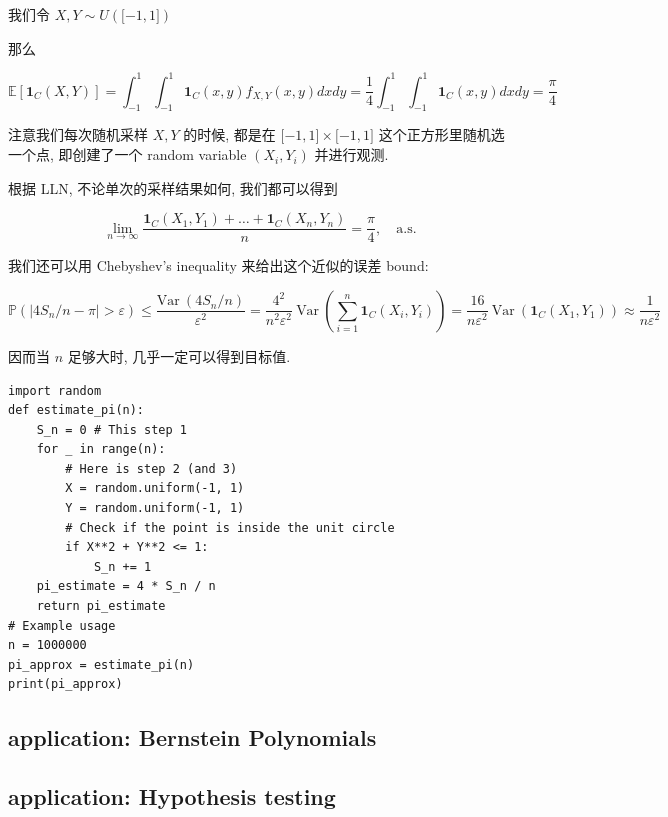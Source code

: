 \documentclass{qlnotes-export}
\begin{document}
\begin{example}[估算 \(\pi\)]

我们令 \(X,Y \sim U(\lbrack - 1,1\rbrack)\)

那么

\[{\mathbb{E}}\left\lbrack {\mathbf{1}_{C}(X,Y)} \right\rbrack = \int_{- 1}^{1}\int_{- 1}^{1}\mathbf{1}_{C}(x,y)f_{X,Y}(x,y)dxdy = \frac{1}{4}\int_{- 1}^{1}\int_{- 1}^{1}\mathbf{1}_{C}(x,y)dxdy = \frac{\pi}{4}\]

注意我们每次随机采样 \(X,Y\) 的时候, 都是在 \(\lbrack - 1,1\rbrack \times \lbrack - 1,1\rbrack\) 这个正方形里随机选一个点, 即创建了一个 random variable \((X_{i},Y_{i})\) 并进行观测.

根据 LLN, 不论单次的采样结果如何, 我们都可以得到

\[\lim\limits_{n\rightarrow\infty}\frac{\mathbf{1}_{C}\left( {X_{1},Y_{1}} \right) + \ldots + \mathbf{1}_{C}\left( {X_{n},Y_{n}} \right)}{n} = \frac{\pi}{4},\quad\text{a.s.}\]

我们还可以用 Chebyshev's inequality 来给出这个近似的误差 bound:

\[{\mathbb{P}}\left( {\left| {4S_{n}/n - \pi} \right| > \varepsilon} \right) \leq \frac{\text{Var}\ \left( {4S_{n}/n} \right)}{\varepsilon^{2}} = \frac{4^{2}}{n^{2}\varepsilon^{2}}\ \text{Var}\ \left( {\sum\limits_{i = 1}^{n}\mathbf{1}_{C}\left( {X_{i},Y_{i}} \right)} \right) = \frac{16}{n\varepsilon^{2}}\ \text{Var}\ \left( {\mathbf{1}_{C}\left( {X_{1},Y_{1}} \right)} \right) \approx \frac{1}{n\varepsilon^{2}}\]

因而当 \(n\) 足够大时, 几乎一定可以得到目标值.

\begin{verbatim}
import random
def estimate_pi(n):
    S_n = 0 # This step 1
    for _ in range(n):
        # Here is step 2 (and 3)
        X = random.uniform(-1, 1)
        Y = random.uniform(-1, 1)
        # Check if the point is inside the unit circle
        if X**2 + Y**2 <= 1:
            S_n += 1
    pi_estimate = 4 * S_n / n
    return pi_estimate
# Example usage
n = 1000000
pi_approx = estimate_pi(n)
print(pi_approx)
\end{verbatim}

\end{example}

\subsection{application: Bernstein Polynomials}\label{application-bernstein-polynomials}

\subsection{application: Hypothesis testing}\label{application-hypothesis-testing}
\end{document}
